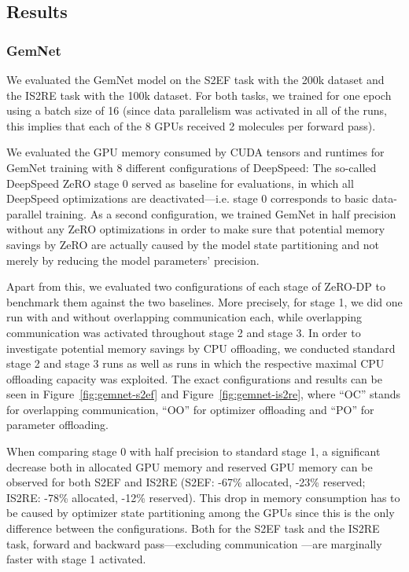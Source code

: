 \subsection{Results}

\subsubsection{GemNet}

We evaluated the GemNet model on the S2EF task with the 200k dataset and
the IS2RE task with the 100k dataset. For both tasks, we trained for one epoch
using a batch size of 16 (since data parallelism was activated in all of the 
runs, this implies that each of the 8 GPUs received 2 molecules per forward pass). 

We evaluated the GPU memory consumed by CUDA tensors and runtimes for GemNet training with 8 different 
configurations of DeepSpeed:
The so-called DeepSpeed ZeRO stage 0 served as baseline for evaluations, in which 
all DeepSpeed optimizations are deactivated---i.e. stage 0 corresponds to basic 
data-parallel training. As a second configuration, we trained GemNet 
in half precision without any ZeRO optimizations in order to make sure that
potential memory savings by ZeRO are actually caused by the model state partitioning and
not merely by reducing the model parameters' precision.

Apart from this, we evaluated two configurations of each stage of ZeRO-DP to benchmark 
them against the two baselines. More precisely, for stage 1, we did one run with and 
without overlapping communication each, while overlapping communication
was activated throughout stage 2 and stage 3. In order to investigate potential 
memory savings by CPU offloading, we conducted standard stage 2 and stage 3 runs as well
as runs in which the respective maximal CPU offloading capacity was exploited.
The exact configurations and results can be seen in Figure~\ref{fig:gemnet-s2ef}
and Figure~\ref{fig:gemnet-is2re}, where \enquote{OC} stands for overlapping communication,
\enquote{OO} for optimizer offloading and \enquote{PO} for parameter offloading.

When comparing stage 0 with half precision to standard stage 1, a significant decrease
both in allocated GPU memory and reserved GPU memory can be observed for both S2EF and IS2RE
(S2EF: -67\% allocated, -23\% reserved; IS2RE: -78\% allocated, -12\% reserved).
This drop in memory consumption has to be caused by optimizer state partitioning among
the GPUs since this is the only difference between the configurations. 
Both for the S2EF task and the IS2RE task, forward and backward pass---excluding communication
---are marginally faster with stage 1 activated. 

